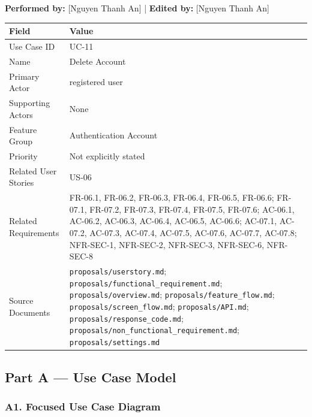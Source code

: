 \documentclass[12pt]{article}
\renewcommand{\baselinestretch}{1.5}
\begin{document}
\textbf{Performed by:} [Nguyen Thanh An] | \textbf{Edited by:} [Nguyen Thanh An]
\par\medskip

\begingroup
\small
\renewcommand{\baselinestretch}{1.0}\selectfont
\renewcommand{\arraystretch}{1.15}
\setlength{\tabcolsep}{6pt}
\begin{longtable}{|>{\raggedright\arraybackslash}p{}|>{\raggedright\arraybackslash}p{}|}
\hline
\textbf{Field} & \textbf{Value} \\ \hline
\endhead
Use Case ID & UC-11 \\ \hline
Name & Delete Account \\ \hline
Primary Actor & registered user \\ \hline
Supporting Actors & None \\ \hline
Feature Group & Authentication Account \\ \hline
Priority & Not explicitly stated \\ \hline
Related User Stories & US-06 \\ \hline
Related Requirements & FR-06.1, FR-06.2, FR-06.3, FR-06.4, FR-06.5, FR-06.6; FR-07.1, FR-07.2, FR-07.3, FR-07.4, FR-07.5, FR-07.6; AC-06.1, AC-06.2, AC-06.3, AC-06.4, AC-06.5, AC-06.6; AC-07.1, AC-07.2, AC-07.3, AC-07.4, AC-07.5, AC-07.6, AC-07.7, AC-07.8; NFR-SEC-1, NFR-SEC-2, NFR-SEC-3, NFR-SEC-6, NFR-SEC-8 \\ \hline
Source Documents & \texttt{proposals/userstory.md}; \texttt{proposals/functional\_requirement.md}; \texttt{proposals/overview.md}; \texttt{proposals/feature\_flow.md}; \texttt{proposals/screen\_flow.md}; \texttt{proposals/API.md}; \texttt{proposals/response\_code.md}; \texttt{proposals/non\_functional\_requirement.md}; \texttt{proposals/settings.md} \\ \hline
\end{longtable}
\endgroup
\par\medskip

\hypertarget{sec:part-a-use-case-model}{}
\subsection*{Part A --- Use Case Model}
\par\medskip

\hypertarget{sec:a1-focused-use-case-diagram}{}
\subsubsection*{A1. Focused Use Case Diagram}
\par\medskip
\end{document}
